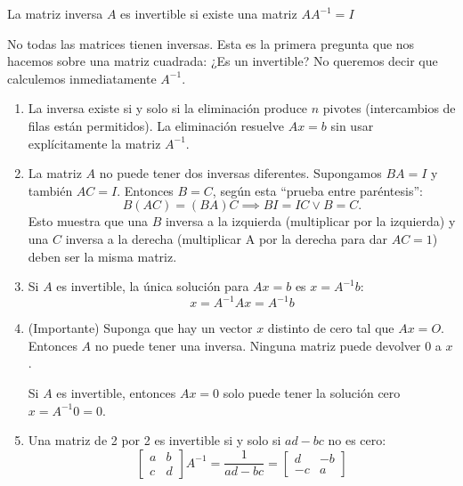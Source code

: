 \begin{definition}
	La matriz inversa $A$ es invertible si existe una matriz $AA^{-1}=I$
\end{definition}

No todas las matrices tienen inversas. Esta es la primera pregunta que nos hacemos sobre una matriz cuadrada:
¿Es un invertible? No queremos decir que calculemos inmediatamente $A^{-1}$.

\begin{enumerate}

	\item La inversa existe si y solo si la eliminación produce $n$ pivotes (intercambios de filas
	      están permitidos). La eliminación resuelve $Ax = b$ sin usar explícitamente la matriz $A^{-1}$.
	\item La matriz $A$ no puede tener dos inversas diferentes. Supongamos $BA = I$ y también
	      $AC = I$. Entonces $B = C$, según esta ``prueba entre paréntesis'':
	      \begin{equation}
		      B (AC)= (BA)C \implies BI=IC \lor B=C.
	      \end{equation}
	      Esto muestra que una $B$ inversa a la izquierda (multiplicar por la izquierda) y una $C$ inversa a la derecha (multiplicar A por la derecha para dar $AC = 1$) deben ser la misma matriz.
	\item Si $A$ es invertible, la única solución para $Ax = b$ es $x = A^{-1}b$:
	      \begin{equation}
		      x=A^{-1}Ax=A^{-1}b
	      \end{equation}

	\item (Importante) Suponga que hay un vector $x$ distinto de cero tal que $Ax = O$. Entonces $A$
	      no puede tener una inversa. Ninguna matriz puede devolver 0 a $x$.

	      Si $A$ es invertible, entonces $Ax = 0$ solo puede tener la solución cero $x=A^{-1}0 = 0$.
	\item Una matriz de 2 por 2 es invertible si y solo si $ad - bc$ no es cero:
	      \begin{equation*}
		      \begin{bmatrix}
			      a & b \\c&d
		      \end{bmatrix} A^{-1}=\frac{1}{ad-bc}=\begin{bmatrix}
			      d & -b \\-c&a
		      \end{bmatrix}
	      \end{equation*}


\end{enumerate}
